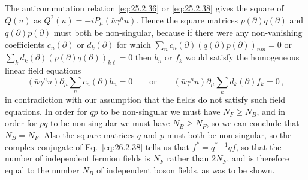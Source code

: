 The anticommutation relation \eqref{eq:25.2.36} or \eqref{eq:25.2.38} gives
the square of $Q(u)$ as $Q^2(u)=-iP_\mu(\bar u\gamma^\mu u)$. Hence the
square matrices $p(\partial)q(\partial)$ and $q(\partial)p(\partial)$ must
both be non-singular, because if there were any non-vanishing coefficients
$c_n(\partial)$ or $d_k(\partial)$ for which
$\sum_n c_n(\partial)(q(\partial)p(\partial))_{nm}=0$ or
$\sum_k d_k(\partial)(p(\partial)q(\partial))_{k\ell}=0$ then $b_n$ or $f_k$
would satisfy the homogeneous linear field equations
\[
  (\bar u\gamma^\mu u)\partial_\mu
    \sum_n c_n(\partial)b_n=0
  \qquad\text{or}\qquad
  (\bar u\gamma^\mu u)\partial_\mu
    \sum_k d_k(\partial)f_k=0\,,
\]
in contradiction with our assumption that the fields do not satisfy such
field equations. In order for $qp$ to be non-singular we must have
$N_F\geq N_B$, and in order for $pq$ to be non-singular we must have
$N_B\geq N_F$, so we can conclude that $N_B=N_F$. Also the square matrices
$q$ and $p$ must both be non-singular, so the complex conjugate of
Eq.~\eqref{eq:26.2.38} tells us that $f^*=q^{*-1}qf$, so that the number of
independent fermion fields is $N_F$ rather than $2N_F$, and is therefore
equal to the number $N_B$ of independent boson fields, as was to be shown.
